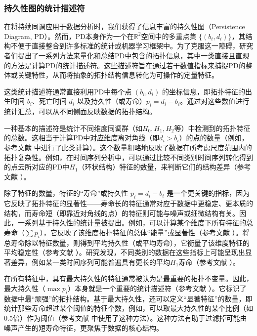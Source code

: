         \subsubsection{持久性图的统计描述符}
            \label{sec:pd_stats}
            在将持续同调应用于数据分析时，我们获得了信息丰富的持久性图（Persistence Diagram, PD）。然而，PD本身作为一个在$\mathbb{R}^2$空间中的多重点集 $\{(b_i, d_i)\}$，其结构不便于直接整合到许多标准的统计或机器学习框架中。为了克服这一障碍，研究者们提出了一系列方法来量化和总结PD中包含的拓扑信息，其中一类直接且直观的方法是计算PD的统计描述符。这些描述符旨在通过若干数值指标来捕捉PD的整体或关键特性，从而将抽象的拓扑结构信息转化为可操作的定量特征。

            这类统计描述符通常直接利用PD中每个点 $(b_i, d_i)$ 的坐标信息，即拓扑特征的出生时间 $b_i$、死亡时间 $d_i$ 以及持久性（或寿命）$p_i = d_i - b_i$。通过对这些数值进行统计汇总，可以从不同侧面反映数据的拓扑结构。
            
            一种基本的描述符是统计不同维度同调群（如$H_0, H_1, H_2$等）中检测到的拓扑特征的总数。这相当于计算PD中对应维度离对角线（即$d_i > b_i$）的点的数量（例如，参考文献 \cite{source:371, source:372} 中进行了此类计算）。这个数量粗略地反映了数据在所考虑尺度范围内的拓扑复杂性。例如，在时间序列分析中，可以通过比较不同类别时间序列转化得到的点云所对应的PD中$H_1$（环状结构）特征的数量，来判断它们的结构差异（参考文献 \cite{source:373}）。
            
            除了特征的数量，特征的“寿命”或持久性 $p_i = d_i - b_i$ 是一个更关键的指标，因为它反映了拓扑特征的显著性——寿命长的特征通常对应于数据中更稳定、更本质的结构，而寿命短（即靠近对角线的点）的特征则可能与噪声或细微结构有关。因此，一系列基于持久性的统计量被提出。例如，可以计算某个维度下所有特征的总寿命（$\sum p_i$），它反映了该维度拓扑特征的总体“能量”或显著性（参考文献 \cite{source:374, source:375}）。将总寿命除以特征数量，则得到平均持久性（或平均寿命），它衡量了该维度特征的平均稳定性（参考文献 \cite{source:376, source:377}）。研究发现，不同类别的数据在这些指标上可能呈现出显著差异，例如某一类时间序列可能普遍具有更长的平均$H_1$寿命（参考文献 \cite{source:378}）。
            
            在所有特征中，具有最大持久性的特征通常被认为是最重要的拓扑不变量。因此，最大持久性（$\max p_i$）本身就是一个重要的统计描述符（参考文献 \cite{source:379}）。它标识了数据中最“顽强”的拓扑结构。基于最大持久性，还可以定义“显著特征”的数量，即统计那些寿命超过某个阈值的特征个数，例如，可以取最大持久性的某个比例（如0.5倍）作为阈值（参考文献 \cite{source:381} 中使用了这种方法）。这种方法有助于过滤掉可能由噪声产生的短寿命特征，更聚焦于数据的核心结构。
            
